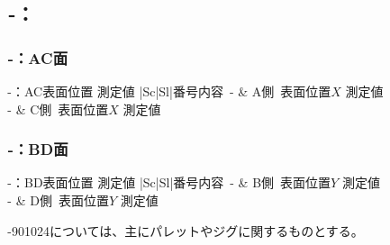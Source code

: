 \clearpage
\subsection{\,-：\dimple}

\subsubsection{\,-：\dimple AC面}

\begin{2columnstable}[white]{\,-：\dimple AC表面位置 測定値 \DMLthreeAC}{|Sc|Sl|}{番号}{内容}
\,- & A側\dimple~表面位置$X$ 測定値\\\hline
{}\,- & C側\dimple~表面位置$X$ 測定値
\end{2columnstable}

\subsubsection{\,-：\dimple BD面}

\begin{2columnstable}[white]{\,-：\dimple BD表面位置 測定値 \DMLthreeBD}{|Sc|Sl|}{番号}{内容}
\,- & B側\dimple~表面位置$Y$ 測定値\\\hline
{}\,- & D側\dimple~表面位置$Y$ 測定値
\end{2columnstable}



\clearpage
\,-\ttNum901024については、主にパレットやジグに関するものとする。\\

